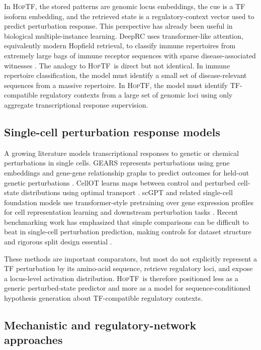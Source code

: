 \documentclass[11pt]{article}
\newcommand{\hoptf}{\textsc{HopTF}}
\begin{document}
In \hoptf, the stored patterns are genomic locus embeddings, the cue is a TF isoform embedding, and the retrieved state is a regulatory-context vector used to predict perturbation response. This perspective has already been useful in biological multiple-instance learning. DeepRC uses transformer-like attention, equivalently modern Hopfield retrieval, to classify immune repertoires from extremely large bags of immune receptor sequences with sparse disease-associated witnesses \citep{widrich2020}. The analogy to \hoptf\ is direct but not identical. In immune repertoire classification, the model must identify a small set of disease-relevant sequences from a massive repertoire. In \hoptf, the model must identify TF-compatible regulatory contexts from a large set of genomic loci using only aggregate transcriptional response supervision.

\subsection{Single-cell perturbation response models}

A growing literature models transcriptional responses to genetic or chemical perturbations in single cells. GEARS represents perturbations using gene embeddings and gene-gene relationship graphs to predict outcomes for held-out genetic perturbations \citep{roohani2023}. CellOT learns maps between control and perturbed cell-state distributions using optimal transport \citep{bunne2023}. scGPT and related single-cell foundation models use transformer-style pretraining over gene expression profiles for cell representation learning and downstream perturbation tasks \citep{cui2024}. Recent benchmarking work has emphasized that simple comparisons can be difficult to beat in single-cell perturbation prediction, making controls for dataset structure and rigorous split design essential \citep{ahlmanneltze2025}.

These methods are important comparators, but most do not explicitly represent a TF perturbation by its amino-acid sequence, retrieve regulatory loci, and expose a locus-level activation distribution. \hoptf\ is therefore positioned less as a generic perturbed-state predictor and more as a model for sequence-conditioned hypothesis generation about TF-compatible regulatory contexts.

\subsection{Mechanistic and regulatory-network approaches}
\end{document}
